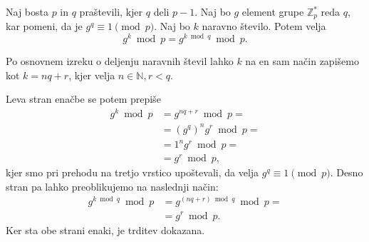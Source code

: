 \documentclass[isrm2, tisk]{fmfdelo}
\newcommand{\N}{\mathbb N}
\newcommand{\Z}{\mathbb Z}
\begin{document}
\begin{trditev}
\label{trd:mod-q}
    Naj bosta $p$ in $q$ praštevili, kjer $q$ deli $p - 1$. Naj bo $g$ element grupe $\Z_p^*$ reda
    $q$, kar pomeni, da je $g^q \equiv 1 \pmod p$. Naj bo $k$
    naravno število. Potem velja 
    $$ 
    g^k \bmod p = g^{k \bmod q} \bmod p.
    $$
\end{trditev}
\begin{dokaz}
    Po osnovnem izreku o deljenju naravnih števil lahko $k$ na en sam način zapišemo kot $k = nq + r$, 
    kjer velja $n \in \N, r < q$.

    Leva stran enačbe se potem prepiše 
    \begin{align*}
        g^k \bmod p &= g^{nq + r} \bmod p = \\
                    &= (g^q)^n g^r \bmod p = \\
                    &= 1^n g^r \bmod p = \\
                    &= g^r \bmod p,
    \end{align*}
    kjer smo pri prehodu na tretjo vrstico upoštevali, da velja $g^q \equiv 1 \pmod p$. Desno stran
    pa lahko preoblikujemo na naslednji način:
    \begin{align*}
        g^{k \bmod q} \bmod p &= g^{(nq + r) \bmod q} \bmod p = \\ 
                              &= g^r \bmod p.
    \end{align*}
    Ker sta obe strani enaki, je trditev dokazana.
\end{dokaz}
\end{document}
